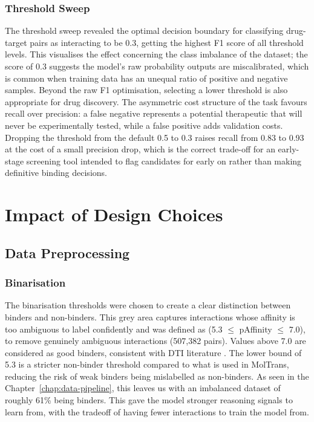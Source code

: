 \subsubsection{Threshold Sweep}
The threshold sweep revealed the optimal decision boundary for classifying drug-target pairs as interacting to be 0.3, getting the highest F1 score of all threshold levels.
This visualises the effect concerning the class imbalance of the dataset; the score of 0.3 suggests the model's raw probability outputs are miscalibrated, which is common when training data has an unequal ratio of positive and negative samples.
Beyond the raw F1 optimisation, selecting a lower threshold is also appropriate for drug discovery.
The asymmetric cost structure of the task favours recall over precision: a false negative represents a potential therapeutic that will never be experimentally tested, while a false positive adds validation costs.
Dropping the threshold from the default 0.5 to 0.3 raises recall from 0.83 to 0.93 at the cost of a small precision drop, which is the correct trade-off for an early-stage screening tool intended to flag candidates for early on rather than making definitive binding decisions.

\section{Impact of Design Choices}
\subsection{Data Preprocessing}
\subsubsection{Binarisation}
The binarisation thresholds were chosen to create a clear distinction between binders and non-binders.
This grey area captures interactions whose affinity is too ambiguous to label confidently and was defined as (5.3 $\leq$ pAffinity $\leq$ 7.0), to remove genuinely ambiguous interactions (507,382 pairs).
Values above 7.0 are considered as good binders, consistent with DTI literature \citep{huang2021moltrans}.
The lower bound of 5.3 is a stricter non-binder threshold compared to what is used in MolTrans, reducing the risk of weak binders being mislabelled as non-binders.
As seen in the Chapter~\ref{chap:data-pipeline}, this leaves us with an imbalanced dataset of roughly 61\% being binders.
This gave the model stronger reasoning signals to learn from, with the tradeoff of having fewer interactions to train the model from.

